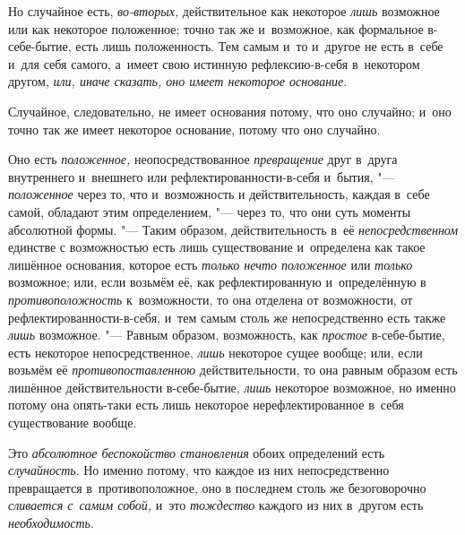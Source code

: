 Но случайное есть, {\em во-вторых,} действительное как
некоторое {\em лишь} возможное или как некоторое
положенное; точно так же и~возможное, как формальное в-себе-бытие, есть
лишь положенность. Тем самым и~то и~другое не есть в~себе и~для себя
самого, а~имеет свою истинную рефлексию-в-себя в~некотором другом,
{\em или, иначе сказать, оно имеет некоторое основание}.

Случайное, следовательно, не имеет основания потому, что оно случайно; и~оно
точно так же имеет некоторое основание, потому что оно случайно.

Оно есть {\em положенное,} неопосредствованное
{\em превращение} друг в~друга внутреннего и~внешнего
или рефлектированности-в-себя и~бытия, "---
{\em положенное} через то, что и~возможность и
действительность, каждая в~себе самой, обладают этим определением, "--- через
то, что они суть моменты абсолютной формы. "--- Таким образом,
действительность в~её {\em непосредственном} единстве с
возможностью есть лишь существование и~определена как такое лишённое
основания, которое есть {\em только нечто положенное}
или {\em только} возможное; или, если возьмём её, как
рефлектированную и~определённую в
{\em противоположность} к~возможности, то она отделена
от возможности, от рефлектированности-в-себя, и~тем самым столь же
непосредственно есть также {\em лишь} возможное. "---
Равным образом, возможность, как {\em простое}
в-себе-бытие, есть некоторое непосредственное,
{\em лишь} некоторое сущее вообще; или, если возьмём её
{\em противопоставленною} действительности, то она
равным образом есть лишённое действительности в-себе-бытие,
{\em лишь} некоторое возможное, но именно потому она
опять-таки есть лишь некоторое нерефлектированное в~себя существование вообще.

Это {\em абсолютное беспокойство становления} обоих
определений есть {\em случайность}. Но именно потому,
что каждое из них непосредственно превращается в~противоположное, оно в
последнем столь же безоговорочно {\em сливается с~самим
собой,} и~это {\em тождество} каждого из них в~другом есть {\em необходимость}.

